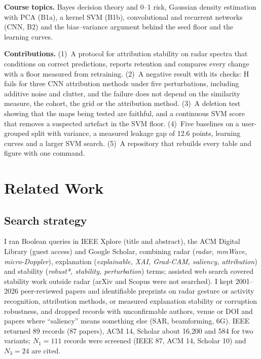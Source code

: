 \documentclass[11pt]{article}
\begin{document}
\textbf{Course topics.} Bayes decision theory and 0--1 risk, Gaussian density estimation with PCA (B1a), a kernel SVM (B1b), convolutional and recurrent networks (CNN, B2) and the bias--variance argument behind the seed floor and the learning curves.

\textbf{Contributions.} (1)~A protocol for attribution stability on radar spectra that conditions on correct predictions, reports retention and compares every change with a floor measured from retraining. (2)~A negative result with its checks: H fails for three CNN attribution methods under five perturbations, including additive noise and clutter, and the failure does not depend on the similarity measure, the cohort, the grid or the attribution method. (3)~A deletion test showing that the maps being tested are faithful, and a continuous SVM score that removes a suspected artefact in the SVM floor. (4)~Five baselines on a user-grouped split with variance, a measured leakage gap of 12.6 points, learning curves and a larger SVM search. (5)~A repository that rebuilds every table and figure with one command.

\section{Related Work}
\subsection{Search strategy}
\noindent I ran Boolean queries in IEEE Xplore (title and abstract), the ACM Digital Library (guest access) and Google Scholar, combining radar (\emph{radar, mmWave, micro-Doppler}), explanation (\emph{explainable, XAI, Grad-CAM, saliency, attribution}) and stability (\emph{robust*, stability, perturbation}) terms; assisted web search covered stability work outside radar (arXiv and Scopus were not searched). I kept 2001--2026 peer-reviewed papers and identifiable preprints on radar gesture or activity recognition, attribution methods, or measured explanation stability or corruption robustness, and dropped records with unconfirmable authors, venue or DOI and papers where ``saliency'' means something else (SAR, beamforming, 6G). IEEE returned 89 records (87 papers), ACM 14, Scholar about 16{,}200 and 584 for two variants; $N_1=111$ records were screened (IEEE 87, ACM 14, Scholar 10) and $N_3=24$ are cited.
\end{document}
